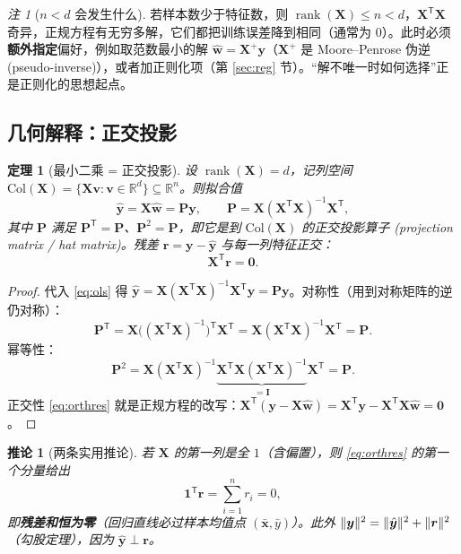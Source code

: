 \documentclass[UTF8,a4paper,11pt]{ctexart}
\theoremstyle{definition}
\theoremstyle{plain}
\newtheorem{theorem}[definition]{定理}
\newtheorem{corollary}[definition]{推论}
\theoremstyle{remark}
\newtheorem{remark}[definition]{注}
\DeclarePairedDelimiter{\norm}{\lVert}{\rVert}
\DeclareMathOperator{\rank}{rank}
\newcommand{\R}{\mathbb{R}}
\newcommand{\T}{^{\mathsf{T}}}
\newcommand{\eng}[1]{\textup{(#1)}}
\begin{document}
\begin{remark}[$n<d$ 会发生什么]
若样本数少于特征数，则 $\rank(\bm{X})\le n<d$，$\bm{X}\T\bm{X}$ 奇异，正规方程有无穷多解，它们都把训练误差降到相同（通常为 $0$）。此时必须\textbf{额外指定}偏好，例如取范数最小的解 $\hat{\bm{w}}=\bm{X}^{+}\bm{y}$（$\bm{X}^{+}$ 是 Moore--Penrose 伪逆 \eng{pseudo-inverse}），或者加正则化项（第 \ref{sec:reg} 节）。“解不唯一时如何选择”正是正则化的思想起点。
\end{remark}

\subsection{几何解释：正交投影}

\begin{theorem}[最小二乘 = 正交投影]\label{thm:projection}
设 $\rank(\bm{X})=d$，记列空间 $\mathrm{Col}(\bm{X})=\{\bm{X}\bm{v}:\bm{v}\in\R^d\}\subseteq\R^n$。则拟合值
\[
  \hat{\bm{y}}=\bm{X}\hat{\bm{w}}=\bm{P}\bm{y},\qquad
  \bm{P}=\bm{X}(\bm{X}\T\bm{X})^{-1}\bm{X}\T ,
\]
其中 $\bm{P}$ 满足 $\bm{P}\T=\bm{P}$、$\bm{P}^2=\bm{P}$，即它是到 $\mathrm{Col}(\bm{X})$ 的正交投影算子 \eng{projection matrix / hat matrix}。残差 $\bm{r}=\bm{y}-\hat{\bm{y}}$ 与每一列特征正交：
\begin{equation}\label{eq:orthres}
  \bm{X}\T\bm{r}=\bm{0}.
\end{equation}
\end{theorem}

\begin{proof}
代入 \eqref{eq:ols} 得 $\hat{\bm{y}}=\bm{X}(\bm{X}\T\bm{X})^{-1}\bm{X}\T\bm{y}=\bm{P}\bm{y}$。对称性（用到对称矩阵的逆仍对称）：
\[
  \bm{P}\T=\bm{X}\big((\bm{X}\T\bm{X})^{-1}\big)^{\mathsf{T}}\bm{X}\T
  =\bm{X}(\bm{X}\T\bm{X})^{-1}\bm{X}\T=\bm{P}.
\]
幂等性：
\[
  \bm{P}^2=\bm{X}(\bm{X}\T\bm{X})^{-1}\underbrace{\bm{X}\T\bm{X}(\bm{X}\T\bm{X})^{-1}}_{=\bm{I}}\bm{X}\T=\bm{P}.
\]
正交性 \eqref{eq:orthres} 就是正规方程的改写：$\bm{X}\T(\bm{y}-\bm{X}\hat{\bm{w}})=\bm{X}\T\bm{y}-\bm{X}\T\bm{X}\hat{\bm{w}}=\bm{0}$。
\end{proof}

\begin{corollary}[两条实用推论]
若 $\bm{X}$ 的第一列是全 $1$（含偏置），则 \eqref{eq:orthres} 的第一个分量给出
\[
  \bm{1}\T\bm{r}=\sum_{i=1}^{n}r_i=0,
\]
即\textbf{残差和恒为零}（回归直线必过样本均值点 $(\bar{\bm{x}},\bar y)$）。此外 $\norm{\bm{y}}^2=\norm{\hat{\bm{y}}}^2+\norm{\bm{r}}^2$（勾股定理），因为 $\hat{\bm{y}}\perp\bm{r}$。
\end{corollary}
\end{document}
